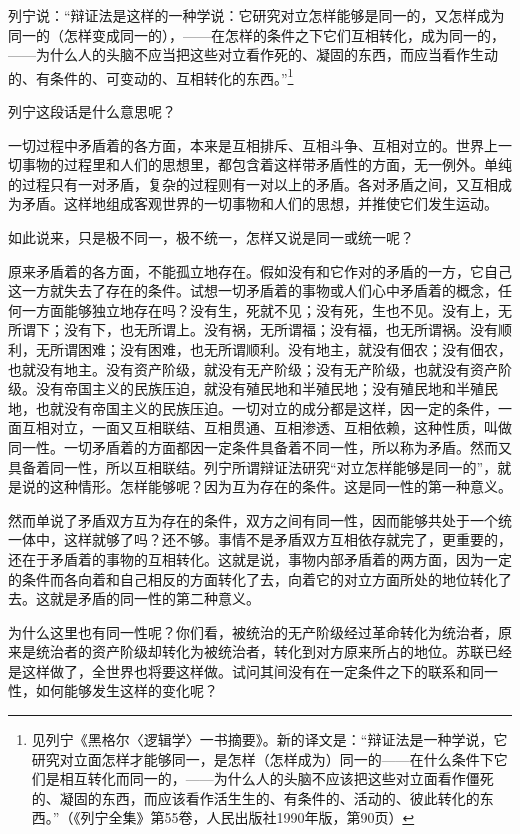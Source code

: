 \documentclass[UTF8, 12pt, a4paper]{ctexrep}
\begin{document}
列宁说：“辩证法是这样的一种学说：它研究对立怎样能够是同一的，又怎样成为同一的（怎样变成同一的），——在怎样的条件之下它们互相转化，成为同一的，——为什么人的头脑不应当把这些对立看作死的、凝固的东西，而应当看作生动的、有条件的、可变动的、互相转化的东西。”\footnote{见列宁《黑格尔〈逻辑学〉一书摘要》。新的译文是：“辩证法是一种学说，它研究对立面怎样才能够同一，是怎样（怎样成为）同一的——在什么条件下它们是相互转化而同一的，——为什么人的头脑不应该把这些对立面看作僵死的、凝固的东西，而应该看作活生生的、有条件的、活动的、彼此转化的东西。”（《列宁全集》第55卷，人民出版社1990年版，第90页）}

列宁这段话是什么意思呢？

一切过程中矛盾着的各方面，本来是互相排斥、互相斗争、互相对立的。世界上一切事物的过程里和人们的思想里，都包含着这样带矛盾性的方面，无一例外。单纯的过程只有一对矛盾，复杂的过程则有一对以上的矛盾。各对矛盾之间，又互相成为矛盾。这样地组成客观世界的一切事物和人们的思想，并推使它们发生运动。

如此说来，只是极不同一，极不统一，怎样又说是同一或统一呢？

原来矛盾着的各方面，不能孤立地存在。假如没有和它作对的矛盾的一方，它自己这一方就失去了存在的条件。试想一切矛盾着的事物或人们心中矛盾着的概念，任何一方面能够独立地存在吗？没有生，死就不见；没有死，生也不见。没有上，无所谓下；没有下，也无所谓上。没有祸，无所谓福；没有福，也无所谓祸。没有顺利，无所谓困难；没有困难，也无所谓顺利。没有地主，就没有佃农；没有佃农，也就没有地主。没有资产阶级，就没有无产阶级；没有无产阶级，也就没有资产阶级。没有帝国主义的民族压迫，就没有殖民地和半殖民地；没有殖民地和半殖民地，也就没有帝国主义的民族压迫。一切对立的成分都是这样，因一定的条件，一面互相对立，一面又互相联结、互相贯通、互相渗透、互相依赖，这种性质，叫做同一性。一切矛盾着的方面都因一定条件具备着不同一性，所以称为矛盾。然而又具备着同一性，所以互相联结。列宁所谓辩证法研究“对立怎样能够是同一的”，就是说的这种情形。怎样能够呢？因为互为存在的条件。这是同一性的第一种意义。

然而单说了矛盾双方互为存在的条件，双方之间有同一性，因而能够共处于一个统一体中，这样就够了吗？还不够。事情不是矛盾双方互相依存就完了，更重要的，还在于矛盾着的事物的互相转化。这就是说，事物内部矛盾着的两方面，因为一定的条件而各向着和自己相反的方面转化了去，向着它的对立方面所处的地位转化了去。这就是矛盾的同一性的第二种意义。

为什么这里也有同一性呢？你们看，被统治的无产阶级经过革命转化为统治者，原来是统治者的资产阶级却转化为被统治者，转化到对方原来所占的地位。苏联已经是这样做了，全世界也将要这样做。试问其间没有在一定条件之下的联系和同一性，如何能够发生这样的变化呢？
\end{document}
